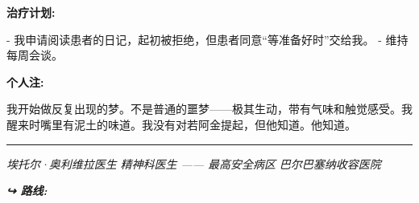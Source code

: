 \noindent \textbf{治疗计划:}

\noindent - 我申请阅读患者的日记，起初被拒绝，但患者同意“等准备好时”交给我。
- 维持每周会谈。

\noindent \textbf{个人注:}

\noindent 我开始做反复出现的梦。不是普通的噩梦——极其生动，带有气味和触觉感受。我醒来时嘴里有泥土的味道。我没有对若阿金提起，但他知道。他知道。

\vspace{0.5em}\noindent\rule{\textwidth}{0.5pt}\vspace{0.5em}

\noindent \textit{埃托尔·奥利维拉医生}
\textit{精神科医生 —— 最高安全病区}
\textit{巴尔巴塞纳收容医院}

\vspace{0.5em}
\noindent\textit{\textbf{↪ 路线:}  \rotasep {} \rotasep {}}
